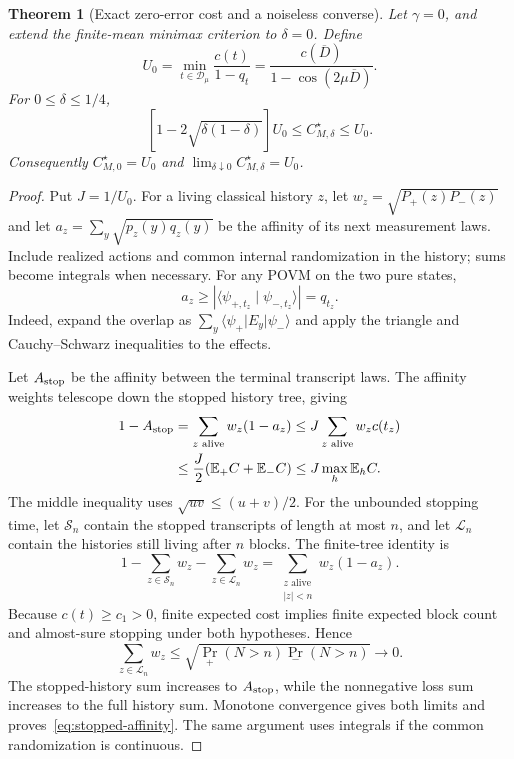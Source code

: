 \documentclass[11pt,a4paper]{article}
\newcommand{\ket}[1]{\lvert #1\rangle}
\newcommand{\bra}[1]{\langle #1\rvert}
\newcommand{\braket}[2]{\langle #1\mid #2\rangle}
\newcommand{\E}{\mathbb E}
\newtheorem{theorem}{Theorem}[section]
\theoremstyle{definition}
\theoremstyle{remark}
\numberwithin{equation}{section}
\begin{document}
\begin{theorem}[Exact zero-error cost and a noiseless converse]\label{thm:noiseless-converse}
Let $\gamma=0$, and extend the finite-mean minimax criterion to
$\delta=0$. Define
\begin{equation}\label{eq:zero-error-optimum}
 U_0=\min_{t\in\mathcal D_\mu}\frac{c(t)}{1-q_t}
    =\frac{c(\overline D)}{1-\cos(2\mu\overline D)}.
\end{equation}
For $0\leq\delta\leq1/4$,
\begin{equation}\label{eq:noiseless-converse}
 [1-2\sqrt{\delta(1-\delta)}]U_0
 \leq C_{M,\delta}^\star\leq U_0.
\end{equation}
Consequently $C_{M,0}^\star=U_0$ and
$\lim_{\delta\downarrow 0}C_{M,\delta}^\star=U_0$.
\end{theorem}
\begin{proof}
Put $J=1/U_0$. For a living classical history $z$, let
$w_z=\sqrt{P_+(z)P_-(z)}$ and let
$a_z=\sum_y\sqrt{p_z(y)q_z(y)}$ be the affinity of its next
measurement laws. Include realized actions and common internal
randomization in the history; sums become integrals when necessary.
For any POVM on the two pure states,
\[
 a_z\geq|\braket{\psi_{+,t_z}}{\psi_{-,t_z}}|=q_{t_z}.
\]
Indeed, expand the overlap as
$\sum_y\bra{\psi_+}E_y\ket{\psi_-}$ and apply the triangle and
Cauchy--Schwarz inequalities to the effects.

Let $A_{\rm stop}$ be the affinity between the terminal transcript laws.
The affinity weights telescope down the stopped history tree, giving
\begin{align}
 1-A_{\rm stop}
 &=\sum_{z\text{ alive}}w_z(1-a_z)
 \leq J\sum_{z\text{ alive}}w_zc(t_z)\notag\\
 &\leq\frac J2(\E_+C+\E_-C)
 \leq J\max_h\E_h C.\label{eq:stopped-affinity}
\end{align}
The middle inequality uses $\sqrt{uv}\leq(u+v)/2$. For the unbounded
stopping time, let $\mathcal S_n$ contain the stopped transcripts of
length at most $n$, and let $\mathcal L_n$ contain the histories still
living after $n$ blocks. The finite-tree identity is
\[
 1-\sum_{z\in\mathcal S_n}w_z-\sum_{z\in\mathcal L_n}w_z
 =\sum_{\substack{z\text{ alive}\\|z|<n}}w_z(1-a_z).
\]
Because $c(t)\geq c_1>0$, finite expected cost implies finite expected
block count and almost-sure stopping under both hypotheses. Hence
\[
 \sum_{z\in\mathcal L_n}w_z
 \leq\sqrt{\Pr_+(N>n)\Pr_-(N>n)}\longrightarrow0.
\]
The stopped-history sum increases to $A_{\rm stop}$, while the
nonnegative loss sum increases to the full history sum. Monotone
convergence gives both limits and proves~\eqref{eq:stopped-affinity}.
The same argument uses integrals if the common randomization is continuous.


\end{proof}
\end{document}
